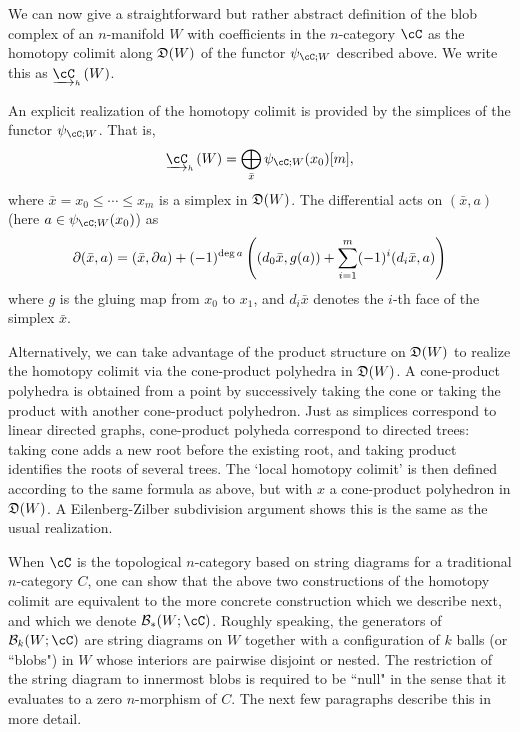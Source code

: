 \documentclass{pnastwo}
\begin{document}
\begin{article}
We can now give a straightforward but rather abstract definition of the blob complex of an $n$-manifold $W$
with coefficients in the $n$-category $\cC$ as the homotopy colimit along $\mathfrak{D}(W)$
of the functor $\psi_{\cC; W}$ described above. We write this as $\clh{\cC}(W)$.

An explicit realization of the homotopy colimit is provided by the simplices of the functor $\psi_{\cC; W}$. That is, $$\clh{\cC}(W) = \DirectSum_{\bar{x}} \psi_{\cC; W}(x_0)[m],$$ where $\bar{x} = x_0 \leq \cdots \leq x_m$ is a simplex in $\mathfrak{D}(W)$. The differential acts on $(\bar{x},a)$ (here $a \in \psi_{\cC; W}(x_0)$) as
$$\partial (\bar{x},a) = (\bar{x}, \partial a) + (-1)^{\deg a} \left( (d_0 \bar{x}, g(a)) + \sum_{i=1}^m (-1)^i (d_i \bar{x}, a) \right)$$
where $g$ is the gluing map from $x_0$ to $x_1$, and $d_i \bar{x}$ denotes the $i$-th face of the simplex $\bar{x}$.

Alternatively, we can take advantage of the product structure on $\mathfrak{D}(W)$ to realize the homotopy colimit via the cone-product polyhedra in $\mathfrak{D}(W)$. A cone-product polyhedra is obtained from a point by successively taking the cone or taking the product with another cone-product polyhedron. Just as simplices correspond to linear directed graphs, cone-product polyheda correspond to directed trees: taking cone adds a new root before the existing root, and taking product identifies the roots of several trees. The `local homotopy colimit' is then defined according to the same formula as above, but with $x$ a cone-product polyhedron in $\mathfrak{D}(W)$.
A Eilenberg-Zilber subdivision argument shows this is the same as the usual realization.

When $\cC$ is the topological $n$-category based on string diagrams for a traditional
$n$-category $C$,
one can show \cite{1009.5025} that the above two constructions of the homotopy colimit
are equivalent to the more concrete construction which we describe next, and which we denote $\bc_*(W; \cC)$.
Roughly speaking, the generators of $\bc_k(W; \cC)$ are string diagrams on $W$ together with
a configuration of $k$ balls (or ``blobs") in $W$ whose interiors are pairwise disjoint or nested.
The restriction of the string diagram to innermost blobs is required to be ``null" in the sense that
it evaluates to a zero $n$-morphism of $C$.
The next few paragraphs describe this in more detail.


\end{article}
\end{document}
